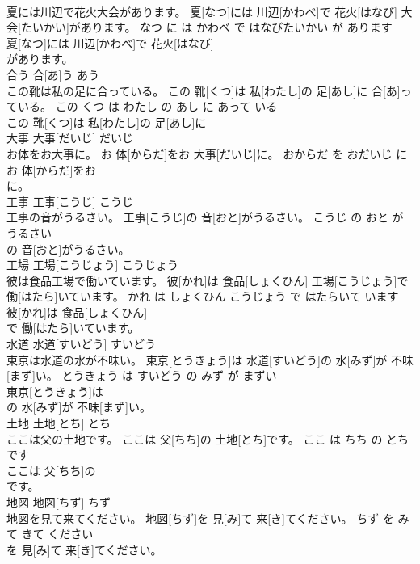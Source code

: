 \documentclass[8pt]{extreport}
\begin{document}
\begin{CJK}{UTF8}{min}
\\	夏には川辺で花火大会があります。	夏[なつ]には 川辺[かわべ]で 花火[はなび] 大会[たいかい]があります。	なつ に は かわべ で はなびたいかい が あります	
\\	夏[なつ]には 川辺[かわべ]で 花火[はなび]
\\	があります。			
\\	合う	合[あ]う	あう	
\\	この靴は私の足に合っている。	この 靴[くつ]は 私[わたし]の 足[あし]に 合[あ]っている。	この くつ は わたし の あし に あって いる	
\\	この 靴[くつ]は 私[わたし]の 足[あし]に
\\	大事	大事[だいじ]	だいじ	
\\	お体をお大事に。	お 体[からだ]をお 大事[だいじ]に。	おからだ を おだいじ に	
\\	お 体[からだ]をお
\\	に。			
\\	工事	工事[こうじ]	こうじ	
\\	工事の音がうるさい。	工事[こうじ]の 音[おと]がうるさい。	こうじ の おと が うるさい	
\\	の 音[おと]がうるさい。			
\\	工場	工場[こうじょう]	こうじょう	
\\	彼は食品工場で働いています。	彼[かれ]は 食品[しょくひん] 工場[こうじょう]で 働[はたら]いています。	かれ は しょくひん こうじょう で はたらいて います	
\\	彼[かれ]は 食品[しょくひん]
\\	で 働[はたら]いています。			
\\	水道	水道[すいどう]	すいどう	
\\	東京は水道の水が不味い。	東京[とうきょう]は 水道[すいどう]の 水[みず]が 不味[まず]い。	とうきょう は すいどう の みず が まずい	
\\	東京[とうきょう]は
\\	の 水[みず]が 不味[まず]い。			
\\	土地	土地[とち]	とち	
\\	ここは父の土地です。	ここは 父[ちち]の 土地[とち]です。	ここ は ちち の とち です	
\\	ここは 父[ちち]の
\\	です。			
\\	地図	地図[ちず]	ちず	
\\	地図を見て来てください。	地図[ちず]を 見[み]て 来[き]てください。	ちず を みて きて ください	
\\	を 見[み]て 来[き]てください。			

\end{CJK}
\end{document}

